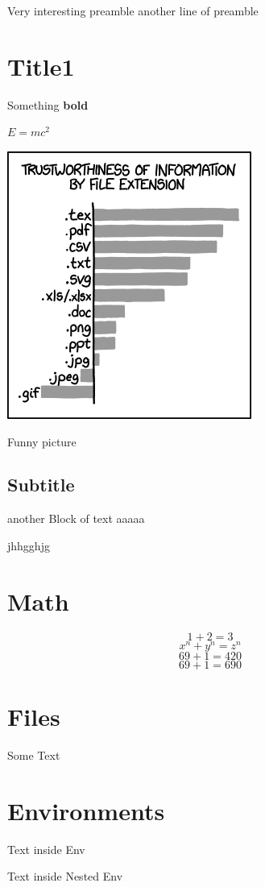Very interesting preamble
another line of preamble

\section{Title1}
Something \textbf{bold}



$E = mc^2$

\includegraphics{image.png}
\caption{Funny picture}
\subsection{Subtitle}
another Block of text
aaaaa

jhhgghjg

\section{Math}
\label{math}
$$1+2 = 3$$
\[x^n + y^n = z^n\]
\begin{displaymath}
69 + 1 = 420
\end{displaymath}
\begin{equation}
69 + 1 = 690
\end{equation}
\section{Files}
Some Text



\section{Environments}
\begin{Some_Env}
Text inside Env

\begin{Nested_Env}
Text inside Nested Env

\end{Nested_Env}
\end{Some_Env}

